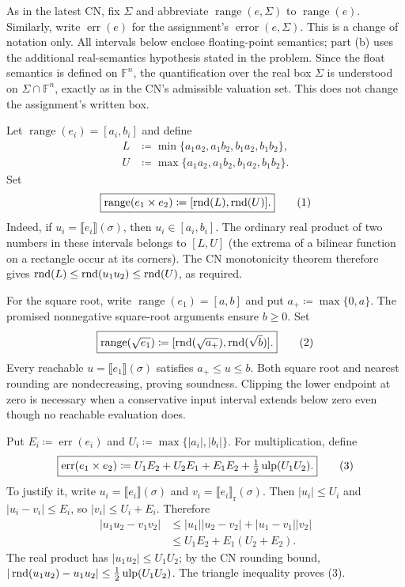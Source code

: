 \documentclass[11pt,oneside]{article}
\begin{document}
\begin{solution}
As in the latest CN, fix $\Sigma$ and abbreviate
$\operatorname{range}(e, \Sigma)$ to $\operatorname{range}(e)$.
Similarly, write $\operatorname{err}(e)$ for the assignment's
$\operatorname{error}(e, \Sigma)$. This is a change of notation only.
All intervals below enclose floating-point semantics; part (b) uses
the additional real-semantics hypothesis stated in the problem.
Since the float semantics is defined on $\mathbb F^n$, the
quantification over the real box $\Sigma$ is understood on
$\Sigma\cap\mathbb F^n$, exactly as in the CN's admissible
valuation set. This does not change the assignment's written box.
\begin{problemsubparts}
\item Let
$\operatorname{range}(e_i)=[a_i, b_i]$ and define
\[
 \begin{aligned}
 L&\coloneqq\min\{a_1a_2, a_1b_2, b_1a_2, b_1b_2\}, \\
 U&\coloneqq\max\{a_1a_2, a_1b_2, b_1a_2, b_1b_2\}.
 \end{aligned}
\]
Set
\[
 \boxed{\operatorname{range}(e_1\times e_2)
 \coloneqq[\operatorname{rnd}(L), \operatorname{rnd}(U)].}
 \tag{1}
\]
Indeed, if $u_i=\llbracket e_i\rrbracket(\sigma)$, then
$u_i\in[a_i, b_i]$. The ordinary real product of two numbers in
these intervals belongs to $[L, U]$ (the extrema of a bilinear
function on a rectangle occur at its corners). The CN
monotonicity theorem therefore gives
$\operatorname{rnd}(L)\le\operatorname{rnd}(u_1u_2)\le\operatorname{rnd}(U)$, as required.

For the square root, write $\operatorname{range}(e_1)=[a, b]$
and put $a_+\coloneqq\max\{0, a\}$. The promised nonnegative
square-root arguments ensure $b\ge0$. Set
\[
 \boxed{\operatorname{range}(\sqrt{e_1})
 \coloneqq[\operatorname{rnd}(\sqrt{a_+}), \operatorname{rnd}(\sqrt b)].}
 \tag{2}
\]
Every reachable $u=\llbracket e_1\rrbracket(\sigma)$ satisfies
$a_+\le u\le b$. Both square root and nearest rounding are
nondecreasing, proving soundness. Clipping the lower endpoint at
zero is necessary when a conservative input interval extends below
zero even though no reachable evaluation does.

\item Put $E_i\coloneqq\operatorname{err}(e_i)$ and
$U_i\coloneqq\max\{|a_i|, |b_i|\}$.
For multiplication, define
\[
 \boxed{\operatorname{err}(e_1\times e_2)
 \coloneqq U_1E_2+U_2E_1+E_1E_2
 +\tfrac12\operatorname{ulp}(U_1U_2).}
 \tag{3}
\]
To justify it, write $u_i=\llbracket e_i\rrbracket(\sigma)$
and $v_i=\llbracket e_i\rrbracket_{\mathrm r}(\sigma)$.
Then $|u_i|\le U_i$ and $|u_i-v_i|\le E_i$, so
$|v_i|\le U_i+E_i$. Therefore
\[
 \begin{aligned}
 |u_1u_2-v_1v_2|
 &\le |u_1||u_2-v_2|+|u_1-v_1||v_2|\\
 &\le U_1E_2+E_1(U_2+E_2).
 \end{aligned}
\]
The real product has $|u_1u_2|\le U_1U_2$; by the CN
rounding bound,
$|\operatorname{rnd}(u_1u_2)-u_1u_2|\le\tfrac12\operatorname{ulp}(U_1U_2)$.
The triangle inequality proves (3).


\end{problemsubparts}
\end{solution}
\end{document}
